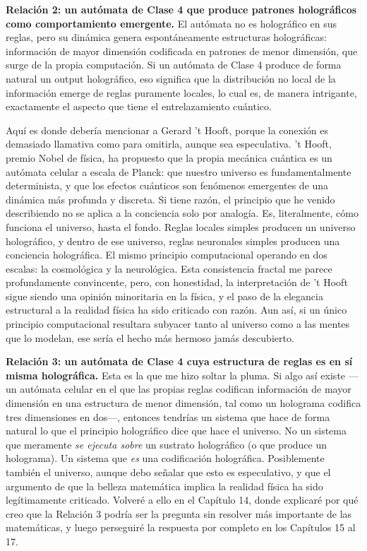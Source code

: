 \documentclass[11pt, twoside, openright]{book}
\begin{document}
\textbf{Relación 2: un autómata de Clase 4 que produce patrones holográficos como comportamiento emergente.} El autómata no es holográfico en sus reglas, pero su dinámica genera espontáneamente estructuras holográficas: información de mayor dimensión codificada en patrones de menor dimensión, que surge de la propia computación. Si un autómata de Clase 4 produce de forma natural un output holográfico, eso significa que la distribución no local de la información emerge de reglas puramente locales, lo cual es, de manera intrigante, exactamente el aspecto que tiene el entrelazamiento cuántico.

Aquí es donde debería mencionar a Gerard 't Hooft, porque la conexión es demasiado llamativa como para omitirla, aunque sea especulativa. 't Hooft, premio Nobel de física, ha propuesto que la propia mecánica cuántica es un autómata celular a escala de Planck: que nuestro universo es fundamentalmente determinista, y que los efectos cuánticos son fenómenos emergentes de una dinámica más profunda y discreta. Si tiene razón, el principio que he venido describiendo no se aplica a la conciencia solo por analogía. Es, literalmente, cómo funciona el universo, hasta el fondo. Reglas locales simples producen un universo holográfico, y dentro de ese universo, reglas neuronales simples producen una conciencia holográfica. El mismo principio computacional operando en dos escalas: la cosmológica y la neurológica. Esta consistencia fractal me parece profundamente convincente, pero, con honestidad, la interpretación de 't Hooft sigue siendo una opinión minoritaria en la física, y el paso de la elegancia estructural a la realidad física ha sido criticado con razón. Aun así, si un único principio computacional resultara subyacer tanto al universo como a las mentes que lo modelan, ese sería el hecho más hermoso jamás descubierto.

\textbf{Relación 3: un autómata de Clase 4 cuya estructura de reglas es en sí misma holográfica.} Esta es la que me hizo soltar la pluma. Si algo así existe ---un autómata celular en el que las propias reglas codifican información de mayor dimensión en una estructura de menor dimensión, tal como un holograma codifica tres dimensiones en dos---, entonces tendrías un sistema que hace de forma natural lo que el principio holográfico dice que hace el universo. No un sistema que meramente \textit{se ejecuta sobre} un sustrato holográfico (o que produce un holograma). Un sistema que \textit{es} una codificación holográfica. Posiblemente también el universo, aunque debo señalar que esto es especulativo, y que el argumento de que la belleza matemática implica la realidad física ha sido legítimamente criticado. Volveré a ello en el Capítulo 14, donde explicaré por qué creo que la Relación 3 podría ser la pregunta sin resolver más importante de las matemáticas, y luego perseguiré la respuesta por completo en los Capítulos 15 al 17.
\end{document}
